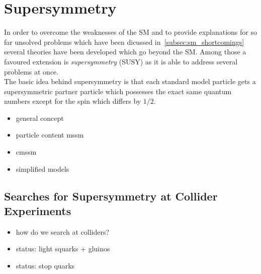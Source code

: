 \section{Supersymmetry}
\label{sec:susy}
In order to overcome the weaknesses of the SM and to provide explanations for so far unsolved problems which have been dicussed in~\ref{subsec:sm_shortcomings} several theories have been developed which go beyond the SM. Among those a favoured extension is \textit{supersymmetry} (SUSY) as it is able to address several problems at once. \\ 
The basic idea behind supersymmetry is that each standard model particle gets a supersymmetric partner particle which possesses the exact same quantum numbers except for the spin which differs by $1/2$.
\begin{itemize}
\item general concept
\item particle content mssm
\item cmssm
\item simplified models
\end{itemize}


\subsection{Searches for Supersymmetry at Collider Experiments}
\label{subsec:susy_status}

\begin{itemize}
\item how do we search at colliders?
\item status: light squarks + gluinos
\item status: stop quarks
\end{itemize}
